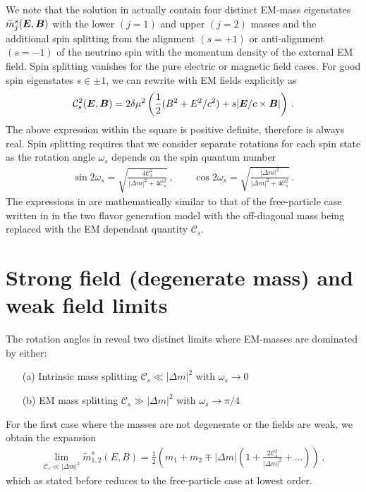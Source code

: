 We note that the solution in  actually contain four distinct EM-mass eigenstates $\widetilde m_{j}^{s}(\boldsymbol{E},\boldsymbol{B})$ with the lower $(j=1)$ and upper $(j=2)$ masses and the additional spin splitting from the alignment $(s=+1)$ or anti-alignment $(s=-1)$ of the neutrino spin with the momentum density of the external EM field. Spin splitting vanishes for the pure electric or magnetic field cases. For good spin eigenstates $s\in\pm1$, we can rewrite  with EM fields explicitly as
\begin{align}
\label{spinsplit:1}
\mathcal{C}^{2}_{s}(\boldsymbol{E},\boldsymbol{B})=2\delta\mu^{2}\left(\frac{1}{2}(B^{2}+E^{2}/c^{2})+s|\boldsymbol{E}/c\times\boldsymbol{B}|\right)\,.
\end{align}
The above expression within the square is positive definite, therefore  is always real. Spin splitting requires that we consider separate rotations for each spin state as the rotation angle $\omega_{s}$ depends on the spin quantum number
\begin{align}
\label{zrot:3}
\sin2\omega_{s}=\sqrt{\frac{4\mathcal{C}_{s}^{2}}{|\Delta m|^{2}+4\mathcal{C}_{s}^{2}}}\,,\qquad
\cos2\omega_{s}=\sqrt{\frac{|\Delta m|^{2}}{|\Delta m|^{2}+4\mathcal{C}_{s}^{2}}}\,.
\end{align}
The expressions in  are mathematically similar to that of the free-particle case written in  in the two flavor generation model with the off-diagonal mass being replaced with the EM dependant quantity $\mathcal{C}_{s}$.

\section{Strong field (degenerate mass) and weak field limits}
\label{sec:nulimits}
The rotation angles in  reveal two distinct limits where EM-masses are dominated by either:
\begin{itemize}[nosep]
    \item[(a)] Intrinsic mass splitting $\mathcal{C}_{s}\ll|\Delta m|^{2}$ with $\omega_{s}\rightarrow0$
    \item[(b)] EM mass splitting $\mathcal{C}_{s}\gg|\Delta m|^{2}$ with $\omega_{s}\rightarrow\pi/4$
\end{itemize}
For the first case where the masses are not degenerate or the fields are weak, we obtain the expansion
\begin{align}
\label{series:1}
\lim_{\mathcal{C}_{s}\ll|\Delta m|^{2}}\widetilde m_{1,2}^{s}(E,B)=\frac{1}{2}\left(m_{1}+m_{2}\mp|\Delta m|\left(1+\frac{2\mathcal{C}_{s}^{2}}{|\Delta m|^{2}}+\ldots\right)\right)\,,
\end{align}
which as stated before reduces to the free-particle case at lowest order.

